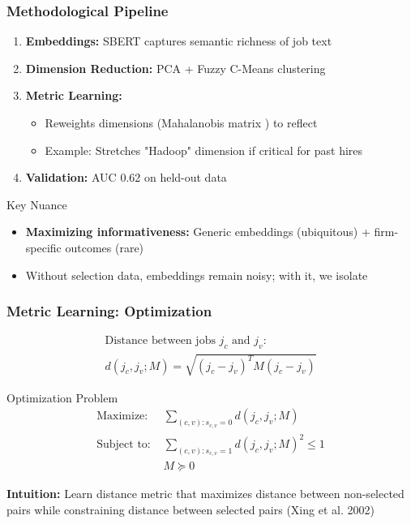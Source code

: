 \documentclass[11pt,xcolor={dvipsnames},hyperref={pdftex,pdfpagemode=UseNone,hidelinks,pdfdisplaydoctitle=true},usepdftitle=false]{beamer}
\begin{document}

\begin{frame}
\frametitle{Methodological Pipeline}
\begin{center}
\end{center}

\begin{enumerate}
\item \textbf{Embeddings:} SBERT captures semantic richness of job text
\item \textbf{Dimension Reduction:} PCA + Fuzzy C-Means clustering
\item \textbf{Metric Learning:}
\begin{itemize}
\item Reweights dimensions (Mahalanobis matrix ) to reflect 
\item Example: Stretches "Hadoop" dimension if critical for past hires
\end{itemize}
\item \textbf{Validation:} AUC 0.62 on held-out data
\end{enumerate}

\begin{block}{Key Nuance}
\begin{itemize}
\item \textbf{Maximizing informativeness:} Generic embeddings (ubiquitous) + firm-specific outcomes (rare)
\item Without selection data, embeddings remain noisy; with it, we isolate 
\end{itemize}
\end{block}
\end{frame}

\begin{frame}
\frametitle{Metric Learning: Optimization}
\begin{align*}
\text{Distance between jobs } j_c \text{ and } j_v: \\
d(j_c, j_v; M) = \sqrt{(j_c - j_v)^T M (j_c - j_v)}
\end{align*}

\begin{block}{Optimization Problem}
\begin{align*}
\text{Maximize: } & \sum_{(c,v): s_{c,v}=0} d(j_c, j_v; M) \\
\text{Subject to: } & \sum_{(c,v): s_{c,v}=1} d(j_c, j_v; M)^2 \leq 1 \\
& M \succeq 0
\end{align*}
\end{block}

\textbf{Intuition:} Learn distance metric that maximizes distance between non-selected pairs while constraining distance between selected pairs (Xing et al. 2002)
\end{frame}
\end{document}
